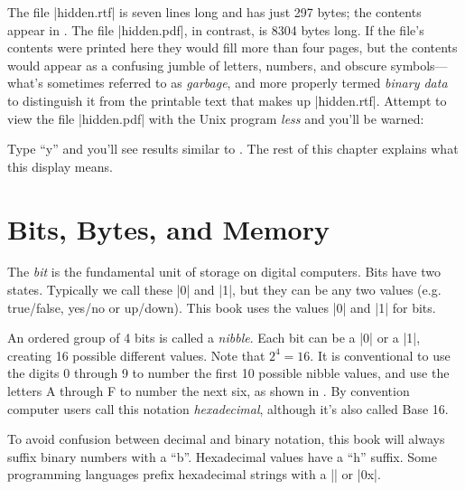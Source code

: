 The file |hidden.rtf| is seven lines long and has just 297 bytes; the contents appear in
. The file |hidden.pdf|, in contrast, is 8304 bytes
long. If the file's contents were printed here they would fill
more than four pages, but the contents would appear as a confusing
jumble of letters, numbers, and obscure symbols---what's sometimes
referred to as \emph{garbage}, and more properly termed \emph{binary
  data} to distinguish it from the printable text that makes up
|hidden.rtf|. Attempt to view the file |hidden.pdf| with the Unix
program \emph{less}  and you'll be warned:


Type ``y'' and you'll see results similar to
. The rest of this chapter explains what
this display means.




\section{Bits, Bytes, and Memory}\label{sec:numbers}
The \emph{bit} is the fundamental unit of storage on digital computers. Bits
have two states. Typically we call these |0| and |1|, but they can be any
two values (e.g. true/false, yes/no or up/down). This book 
uses the values |0| and |1| for bits.

An ordered group of 4 bits is called a \emph{nibble}. Each bit can be
a |0| or a |1|, creating 16 possible different values. Note
that $2^4=16$. It is conventional to use the digits 0 through 9 to
number the first 10 possible nibble values, and use the letters A
through F to number the next six, as shown in . By
convention computer users call this notation \emph{hexadecimal},
although it's also called Base 16.

To avoid confusion between decimal and binary notation, this book will
always suffix binary numbers with a ``b''. Hexadecimal values have a
``h'' suffix. Some programming languages prefix hexadecimal strings
with a |\x| or |0x|. 


